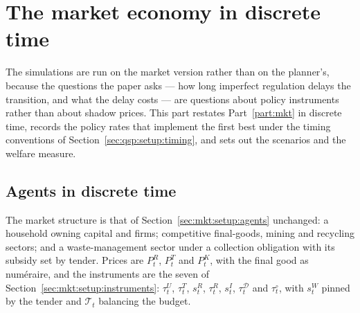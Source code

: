 \section{The market economy in discrete time}\label{sec:qmkt:model}

The simulations are run on the market version rather than on the planner's, because the questions the
paper asks --- how long imperfect regulation delays the transition, and what the delay costs --- are
questions about policy instruments rather than about shadow prices. This part restates
Part~\ref{part:mkt} in discrete time, records the policy rates that implement the first best under the
timing conventions of Section~\ref{sec:qsp:setup:timing}, and sets out the scenarios and the welfare
measure.

\subsection{Agents in discrete time}\label{sec:qmkt:model:agents}

The market structure is that of Section~\ref{sec:mkt:setup:agents} unchanged: a household owning capital
and firms; competitive final-goods, mining and recycling sectors; and a waste-management sector under a
collection obligation with its subsidy set by tender. Prices are $P^R_t$, $P^T_t$ and $P^K_t$, with the
final good as numéraire, and the instruments are the seven of
Section~\ref{sec:mkt:setup:instruments}: $\tau^U_t$, $\tau^T_t$, $s^R_t$, $\tau^R_t$, $s^I_t$,
$\tau^{\mathcal D}_t$ and $\tau^{\circ}_t$, with $s^W_t$ pinned by the tender and $\mathcal T_t$
balancing the budget.

